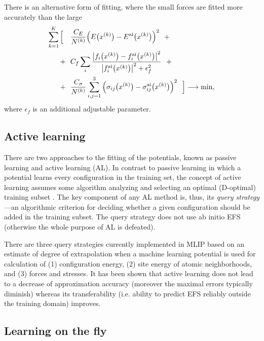 \documentclass[12pt]{article}
\newcommand{\ai}{{\rm ai}}
\renewcommand{\_}{\char`_}
\newcommand{\eps}{{\epsilon}}
\begin{document}
\medskip
There is an alternative form of fitting, where the small forces are fitted more accurately than the large 
\begin{equation}
\label{eq:fitrel}
\begin{split}
\sum_{k=1}^K\Big[~~~&\frac{C_E}{N^{(k)}} \Big(E\big(x^{(k)}\big)-E^\ai\big(x^{(k)}\big)\Big)^2 ~~+\\
+~~&C_f \sum_i \frac{\big|f_i\big(x^{(k)}\big)-f_i^\ai\big(x^{(k)}\big)\big|^2}{\big|f_i^\ai\big(x^{(k)}\big)\big|^2+\eps_f^2}~~+ \\
+~~&\frac{C_\sigma}{N^{(k)}} \sum_{i,j=1}^3  \Big(\sigma_{ij}\big(x^{(k)}\big)-\sigma^\ai_{ij}\big(x^{(k)}\big)\Big)^2 ~~ \Big] \longrightarrow \min,\\
\end{split}
\end{equation}
where $\eps_f$ is an additional adjustable parameter.

\subsection{Active learning}

There are two approaches to the fitting of the potentials, known as passive learning and active learning (AL).
In contrast to passive learning in which a potential learns every configuration in the training set, the concept of active learning assumes some algorithm analyzing and selecting an optimal (D-optimal) training subset \cite{ActiveLearning}. The key component of any AL method is, thus, its \emph{query strategy}---an algorithmic criterion for deciding whether a given configuration should be added in the training subset. 
The query strategy does not use ab initio EFS (otherwise the whole purpose of AL is defeated).

There are three query strategies currently implemented in MLIP based on an estimate of degree of extrapolation when a machine learning potential is used for calculation of (1) configuration energy, (2) site energy of atomic neighborhoods, and (3) forces and stresses.
It has been shown that active learning does not lead to a decrease of approximation accuracy (moreover the maximal errors typically diminish) whereas its transferability (i.e. ability to predict EFS reliably outside the training domain) improves.

\subsection{Learning on the fly}
\end{document}
